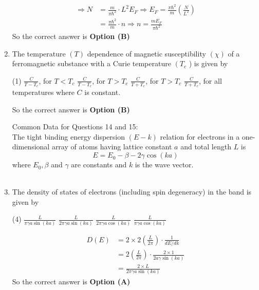 \begin{enumerate}
\begin{answer}
\begin{align*}
\Rightarrow N&=\frac{m}{\pi \hbar^{2}} \cdot L^{2} E_{F} \Rightarrow E_{F}=\frac{\pi \hbar^{2}}{m}\left(\frac{N}{L^{2}}\right)\\&=\frac{\pi \hbar^{2}}{m} \cdot n \Rightarrow n=\frac{m E_{F}}{\pi \hbar^{2}}
\end{align*}
So the correct answer is \textbf{Option (B)}
\end{answer}
	\item The temperature $(T)$ dependence of magnetic susceptibility $(\chi)$ of a ferromagnetic substance with a Curie temperature $\left(T_{c}\right.$ ) is given by
{	}
\begin{tasks}(1)
\task[\textbf{A.}]  $\frac{C}{T-T_{c}}$, for $T<T_{c}$
\task[\textbf{B.}] $\frac{C}{T-T_{c}}$, for $T>T_{c}$
\task[\textbf{C.}] $\frac{C}{T+T_{c}}$, for $T>T_{c}$
\task[\textbf{D.}] $\frac{C}{T+T_{c}}$, for all temperatures
where $C$ is constant.
\end{tasks}
\begin{answer}
So the correct answer is \textbf{Option (B)}
\end{answer}
	Common Data for Questions 14 and 15:\\
	The tight binding energy dispersion $(E-k)$ relation for electrons in a one-dimensional array of atoms having lattice constant $a$ and total length $L$ is
	$$
	E=E_{0}-\beta-2 \gamma \cos (k a)
	$$
	where $E_{0}, \beta$ and $\gamma$ are constants and $k$ is the wave vector.\\\\
	\item The density of states of electrons (including spin degeneracy) in the band is given by
{	}
\begin{tasks}(4)
\task[\textbf{A.}] $\frac{L}{\pi \gamma a \sin (k a)}$
\task[\textbf{B.}] $\frac{L}{2 \pi \gamma a \sin (k a)}$
\task[\textbf{C.}] $\frac{L}{2 \pi \gamma a \cos (k a)}$
\task[\textbf{D.}] $\frac{L}{\pi \gamma a \cos (k a)}$
\end{tasks}
\begin{answer}
\begin{align*}
D(E)&=2 \times 2\left(\frac{L}{2 \pi}\right) \cdot \frac{1}{d E / d k}\\&=2\left(\frac{L}{2 \pi}\right) \cdot \frac{2 \times 1}{2 a \gamma \sin (k a)}\\&=\frac{2 \times L}{2 \pi \gamma a \sin (k a)}
\end{align*}
So the correct answer is \textbf{Option (A)}
\end{answer}

\end{enumerate}
